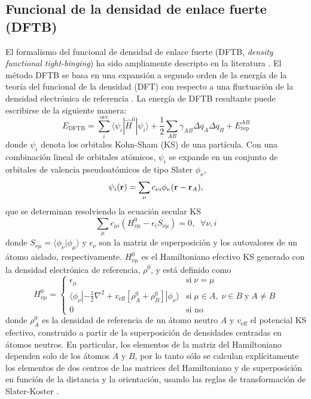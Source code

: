 \subsection{Funcional de la densidad de enlace fuerte (DFTB)}\label{s:dftb}

El formalismo del funcional de densidad de enlace fuerte (DFTB, \textit{density
functional tight-binging}) ha sido ampliamente descripto en la literatura 
\cite{elstner1998,frauenheim2000,seifert2007,gaus2011}. El método DFTB se basa 
en una expansión a segundo orden de la energía de la teoría del funcional de la 
densidad (DFT) con respecto a una fluctuación de la densidad electrónica de 
referencia \cite{foulkes1989}. La energía de DFTB resultante puede escribirse de 
la siguiente manera:
\begin{equation}\label{eq:dftb}
    E_{\text{DFTB}}=\sum_i^{\text{occ}}\langle\psi_i|\hat{H}^0|\psi_i\rangle+\frac{1}{2}\sum_{AB}\gamma_{AB}\Delta q_A\Delta q_B+E_{\text{rep}}^{AB}
\end{equation}
donde $\psi_i$ denota los orbitales Kohn-Sham (KS) de una partícula. Con una 
combinación lineal de orbitales atómicos, $\psi_i$ se expande en un conjunto de 
orbitales de valencia pseudoatómicos de tipo Slater $\phi_\nu$,
\begin{equation}
    \psi_i({\bf r})=\sum_\nu c_{\nu i}\phi_\nu({\bf r}-{\bf r}_A),
\end{equation}
que se determinan resolviendo la ecuación secular KS
\begin{equation}\label{eq:ks}
    \sum_\mu c_{\mu i}\left(H^0_{\nu\mu}-\epsilon_iS_{\nu\mu}\right)=0, \;\;\forall \nu,i
\end{equation}
donde $S_{\nu\mu}=\langle \phi_\nu| \phi_\mu\rangle$ y $\epsilon_\nu$ son la 
matriz de superposición y los autovalores de un átomo aislado, respectivamente.
${H}^0_{\nu\mu}$ es el Hamiltoniano efectivo KS generado con la densidad 
electrónica de referencia, $\rho^0$, y está definido como
\begin{equation}\label{eq:h0}
    H^0_{\nu\mu}=\begin{cases}
        \epsilon_\mu & \text{si}\; \nu=\mu\\
        \langle \phi_{\nu}| -\frac{1}{2}\nabla^2+v_{\text{eff}}\left[\rho_A^0+\rho_B^0\right]|\phi_{\nu}\rangle&\text{si}\;\mu\in A,\; \nu\in B\;\text{y} \;A\ne B\\
        0& \text{si no}
    \end{cases}
\end{equation}
donde $\rho_A^0$ es la densidad de referencia de un átomo neutro $A$ y 
$v_{\text{eff}}$ el potencial KS efectivo, construido a partir de la superposición
de densidades centradas en átomos neutros. En particular, los elementos de la 
matriz del Hamiltoniano dependen solo de los átomos $A$ y $B$, por lo tanto sólo
se calculan explícitamente los elementos de dos centros de las matrices del 
Hamiltoniano y de superposición en función de la distancia y la orientación, usando 
las reglas de transformación de Slater-Koster \cite{slater1954}.

